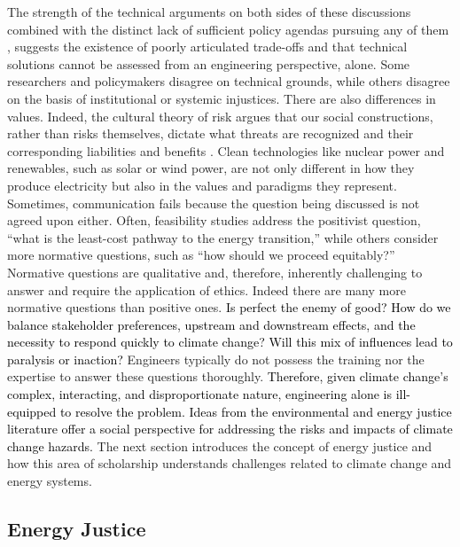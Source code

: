 The strength of the technical arguments on both sides of these discussions
combined with the distinct lack of sufficient policy agendas pursuing any of
them \cite{roelfsema_taking_2020,hale_assessing_2022}, suggests the existence of
poorly articulated trade-offs and that technical solutions cannot be assessed
from an engineering perspective, alone. Some researchers and policymakers
disagree on technical grounds, while others disagree on the basis of
institutional or systemic injustices. There are also differences in values.
Indeed, the cultural theory of risk argues that our social constructions, rather
than risks themselves, dictate what threats are recognized and their
corresponding liabilities and benefits \cite{mcneeley_cultural_2014,
van_de_graaff_understanding_2016}. Clean technologies like nuclear power and
renewables, such as solar or wind power, are not only different in how they
produce electricity but also in the values and paradigms they represent.
Sometimes, communication fails because the question being discussed is not
agreed upon either. Often, feasibility studies address the positivist question,
``what is the least-cost pathway to the energy transition,'' while others
consider more normative questions, such as ``how should we proceed equitably?''
Normative questions are qualitative and, therefore, inherently challenging to
answer and require the application of ethics. Indeed there are many more
normative questions than positive ones. \textcolor{black}{Is perfect the enemy
of good? How do we balance stakeholder preferences, upstream and downstream
effects, and the necessity to respond quickly to climate change? Will this mix
of influences lead to paralysis or inaction?} 
Engineers typically do not possess the training nor the expertise to answer these questions
thoroughly.
\textcolor{black}{Therefore, given climate
change's complex, interacting, and disproportionate nature, engineering alone is
ill-equipped to resolve the problem. Ideas from the environmental and energy
justice literature offer a social perspective for addressing the risks and
impacts of climate change hazards.}
The next section introduces the concept of energy justice and how this area of
scholarship understands challenges related to climate change and energy systems.

\subsection{Energy Justice}

